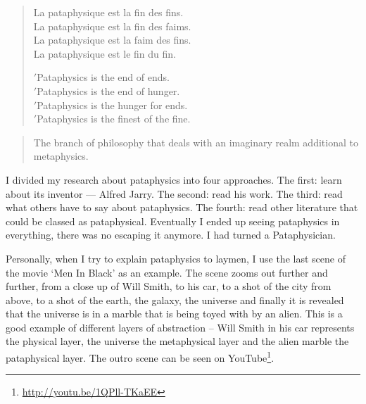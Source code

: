 \begin{quotation}
  \begin{multicols}{2}
  La pataphysique est la fin des fins.\\
  La pataphysique est la fin des faims.\\
  La pataphysique est la faim des fins.\\
  La pataphysique est le fin du fin.
  \par \vfill \columnbreak{}
  \begin{flushright}
  $'$Pataphysics is the end of ends.\\
  $'$Pataphysics is the end of hunger.\\
  $'$Pataphysics is the hunger for ends.\\
  $'$Pataphysics is the finest of the fine.
  \end{flushright}
  \end{multicols}
\end{quotation}

\begin{quotation}
  The branch of philosophy that deals with an imaginary realm additional to metaphysics. 
\end{quotation}

I divided my research about pataphysics into four approaches. The first: learn about its inventor --- Alfred Jarry. The second: read his work. The third: read what others have to say about pataphysics. The fourth: read other literature that could be classed as pataphysical. Eventually I ended up seeing pataphysics in everything, there was no escaping it anymore. I had turned a Pataphysician.

Personally, when I try to explain pataphysics to laymen, I use the last scene of the movie `Men In Black' as an example. The scene zooms out further and further, from a close up of Will Smith, to his car, to a shot of the city from above, to a shot of the earth, the galaxy, the universe and finally it is revealed that the universe is in a marble that is being toyed with by an alien. This is a good example of different layers of abstraction – Will Smith in his car represents the physical layer, the universe the metaphysical layer and the alien marble the pataphysical layer. The outro scene can be seen on YouTube\footnote{\url{http://youtu.be/1QPll-TKaEE}}.

